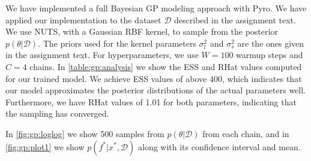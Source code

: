 We have implemented a full Bayesian GP modeling approach with
Pyro. We have applied our implementation to the dataset $\mathcal{D}$ described in the assignment text.
We use NUTS, with a Gaussian RBF kernel, to sample from the posterior $p(\theta | \mathcal{D})$. The priors used for the kernel parameters $\sigma^2_l$ and $\sigma^2_s$ are the ones given in the assignment text.
For hyperparameters, we use $W = 100$ warmup steps and $C = 4$ chains.
In \cref{table:gp:analysis} we show the ESS and RHat values computed for our trained model. We achieve ESS values of above 400, which indicates that our model approximates the posterior distributions of the actual parameters well. Furthermore, we have RHat values of 1.01 for both parameters, indicating that the sampling has converged.
\begin{figure}%
    \begin{floatrow}
        \hspace{35pt}
\end{floatrow}
\end{figure}
In \cref{fig:gp:loglog} we show 500 samples from $p(\theta|\mathcal{D})$ from each chain, and in \cref{fig:gp:plot1} we show $p(f^*|x^*, \mathcal{D})$ along with its confidence interval and mean.

